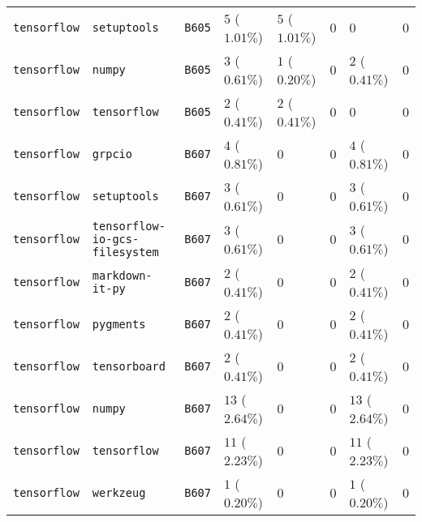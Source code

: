 \begin{table}
\begin{tabular}{llllllll}
\texttt{tensorflow} & \texttt{setuptools} & \texttt{B605} & $5$ ($1.01\%$) & $5$ ($1.01\%$) & $0$ & $0$ & $0$ \\
\texttt{tensorflow} & \texttt{numpy} & \texttt{B605} & $3$ ($0.61\%$) & $1$ ($0.20\%$) & $0$ & $2$ ($0.41\%$) & $0$ \\
\texttt{tensorflow} & \texttt{tensorflow} & \texttt{B605} & $2$ ($0.41\%$) & $2$ ($0.41\%$) & $0$ & $0$ & $0$ \\
\texttt{tensorflow} & \texttt{grpcio} & \texttt{B607} & $4$ ($0.81\%$) & $0$ & $0$ & $4$ ($0.81\%$) & $0$ \\
\texttt{tensorflow} & \texttt{setuptools} & \texttt{B607} & $3$ ($0.61\%$) & $0$ & $0$ & $3$ ($0.61\%$) & $0$ \\
\texttt{tensorflow} & \texttt{tensorflow-io-gcs-filesystem} & \texttt{B607} & $3$ ($0.61\%$) & $0$ & $0$ & $3$ ($0.61\%$) & $0$ \\
\texttt{tensorflow} & \texttt{markdown-it-py} & \texttt{B607} & $2$ ($0.41\%$) & $0$ & $0$ & $2$ ($0.41\%$) & $0$ \\
\texttt{tensorflow} & \texttt{pygments} & \texttt{B607} & $2$ ($0.41\%$) & $0$ & $0$ & $2$ ($0.41\%$) & $0$ \\
\texttt{tensorflow} & \texttt{tensorboard} & \texttt{B607} & $2$ ($0.41\%$) & $0$ & $0$ & $2$ ($0.41\%$) & $0$ \\
\texttt{tensorflow} & \texttt{numpy} & \texttt{B607} & $13$ ($2.64\%$) & $0$ & $0$ & $13$ ($2.64\%$) & $0$ \\
\texttt{tensorflow} & \texttt{tensorflow} & \texttt{B607} & $11$ ($2.23\%$) & $0$ & $0$ & $11$ ($2.23\%$) & $0$ \\
\texttt{tensorflow} & \texttt{werkzeug} & \texttt{B607} & $1$ ($0.20\%$) & $0$ & $0$ & $1$ ($0.20\%$) & $0$ \\
\bottomrule
\end{tabular}
\end{table}
